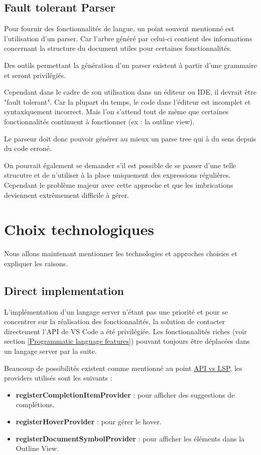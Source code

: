 \documentclass[
    iict, %
    il, %
]{heig-tb}
\begin{document}
\subsection{Fault tolerant Parser}
Pour fournir des fonctionnalités de langue, un point souvent mentionné est l'utilisation d'un parser.
Car l'arbre généré par celui-ci contient des informations concernant la structure du document utiles pour certaines fonctionnalités.

Des outils permettant la génération d'un parser existent à partir d'une grammaire et seront privilégiés.

Cependant dans le cadre de son utilisation dans un éditeur ou IDE, il devrait être "fault tolerant".
Car la plupart du temps, le code dans l'éditeur est incomplet et syntaxiquement incorrect.
Mais l'on s'attend tout de même que certaines fonctionnalités continuent à fonctionner (ex : la outline view).

Le parseur doit donc pouvoir générer au mieux un parse tree qui à du sens depuis du code erroné.

On pourrait également se demander s'il est possible de se passer d'une telle strucutre et de n'utiliser à la place uniquement des expressions régulières.
Cependant le problème majeur avec cette approche et que les imbrications deviennent extrêmement difficile à gérer. \cite{antlr-mega-tutorial}

\section{Choix technologiques}
Nous allons maintenant mentionner les technologies et approches choisies et expliquer les raisons.

\subsection{Direct implementation}
L'implémentation d'un langage server n'étant pas une priorité et pour se concentrer sur la réalisation des fonctionnalités, la solution de contacter directement l'API de VS Code a été privilégiée.
Les fonctionnalités riches (voir section \ref{Programmatic language features}) pouvant toujours être déplacées dans un langage server par la suite.

Beaucoup de possibilités existent comme mentionné au point \hyperref[api vs lsp]{API vs LSP}, les providers utilisés sont les suivants :
\begin{itemize}
    \item \textbf{registerCompletionItemProvider} : pour afficher des suggestions de complétions.
    \item \textbf{registerHoverProvider} : pour gérer le hover.
    \item \textbf{registerDocumentSymbolProvider} : pour afficher les éléments dans la Outline View.
\end{itemize}
\end{document}
